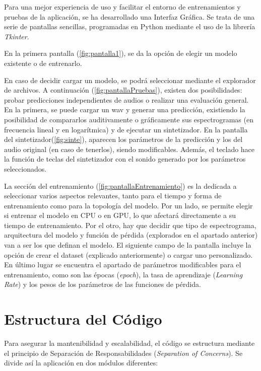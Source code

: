 Para una mejor experiencia de uso y facilitar el entorno de entrenamientos y pruebas de la aplicación, se ha desarrollado una Interfaz Gráfica. Se trata de una serie de pantallas sencillas, programadas en Python mediante el uso de la librería \textit{Tkinter}.

En la primera pantalla (\ref{fig:pantalla1}), se da la opción de elegir un modelo existente o de entrenarlo. 

En caso de decidir cargar un modelo, se podrá seleccionar mediante el explorador de archivos. A continuación (\ref{fig:pantallaPruebas}), existen dos posibilidades: probar predicciones independientes de audios o realizar una evaluación general. En la primera, se puede cargar un wav y generar una predicción, existiendo la posibilidad de compararlos auditivamente o gráficamente sus espectrogramas (en frecuencia lineal y en logarítmica) y de ejecutar un sintetizador. En la pantalla del sintetizador(\ref{fig:sinte}), aparecen los parámetros de la predicción y los del audio original (en caso de tenerlos), siendo modificables. Además, el teclado hace la función de teclas del sintetizador con el sonido generado por los parámetros seleccionados. 

La sección del entrenamiento (\ref{fig:pantallaEntrenamiento}) es la dedicada a seleccionar varios aspectos relevantes, tanto para el tiempo y forma de entrenamiento como para la topología del modelo. Por un lado, se permite elegir si entrenar el modelo en CPU o en GPU, lo que afectará directamente a su tiempo de entrenamiento. Por el otro, hay que decidir que tipo de espectrograma, arquitectura del modelo y función de pérdida (explorados en el apartado anterior) van a ser los que definan el modelo. El siguiente campo de la pantalla incluye la opción de crear el dataset (explicado anteriormente) o cargar uno personalizado. En último lugar se encuentra el apartado de parámetros modificables para el entrenamiento, como son las épocas (\textit{epoch}), la tasa de aprendizaje (\textit{Learning Rate}) y los pesos de los parámetros de las funciones de pérdida. 

\section{Estructura del Código}

Para asegurar la mantenibilidad y escalabilidad, el código se estructura mediante el principio de Separación de Responsabilidades (\textit{Separation of Concerns}). Se divide así la aplicación en dos módulos diferentes:

